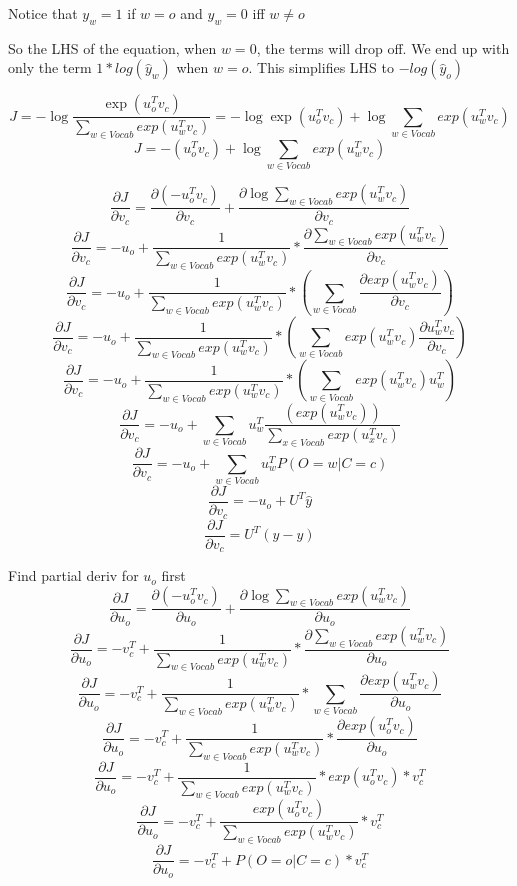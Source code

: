 \documentclass[11pt,largemargins]{homework}
\begin{document}
\maketitle
 
\question
  Notice that $y_w = 1$ if $w = o$ and $y_w = 0$ iff $w \ne o$

  So the LHS of the equation, when $w=0$, the terms will drop off. We end up with only the term $1 * log (\hat{y}_w)$ when $w = o$. This simplifies LHS to $-log (\hat{y}_o)$ 

\question
$$ J = -\log{\frac{\exp(u_o^T v_c)}{\sum_{w \in Vocab}{exp(u^T_w v_c)}}} = -\log{\exp(u_o^T v_c)} + \log{\sum_{w \in Vocab}{exp(u^T_w  v_c)}} $$
$$ J = -(u_o^T v_c) + \log{\sum_{w \in Vocab}{exp(u^T_w  v_c)}} $$

$$ \frac{\partial{J}}{\partial{v_c}} = \frac{\partial{(- u_o^T v_c)}}{\partial{v_c}} + \frac{\partial{\log{\sum_{w \in Vocab}{exp(u^T_w  v_c)}}}}{\partial{v_c}} $$
$$ \frac{\partial{J}}{\partial{v_c}} = -u_o + \frac{1}{\sum_{w \in Vocab}{exp(u^T_w  v_c)}} * \frac{\partial{\sum_{w \in Vocab}{exp(u^T_w  v_c)}}}{\partial{v_c}} $$
$$ \frac{\partial{J}}{\partial{v_c}} = -u_o + \frac{1}{\sum_{w \in Vocab}{exp(u^T_w  v_c)}} * (\sum_{w \in Vocab} \frac{\partial{{exp(u^T_w  v_c)}}}{\partial{v_c}}) $$
$$ \frac{\partial{J}}{\partial{v_c}} = -u_o + \frac{1}{\sum_{w \in Vocab}{exp(u^T_w  v_c)}} * (\sum_{w \in Vocab} exp(u^T_w  v_c) \frac{\partial{u^T_w  v_c}}{\partial{v_c}}) $$
$$ \frac{\partial{J}}{\partial{v_c}} = -u_o + \frac{1}{\sum_{w \in Vocab}{exp(u^T_w  v_c)}} * (\sum_{w \in Vocab} exp(u^T_w  v_c) u^T_w ) $$
$$ \frac{\partial{J}}{\partial{v_c}} = -u_o + \sum_{w \in Vocab} u^T_w \frac{( exp(u^T_w  v_c))}{\sum_{x \in Vocab}{exp(u^T_x  v_c)}} $$
$$ \frac{\partial{J}}{\partial{v_c}} = -u_o + \sum_{w \in Vocab} u^T_w P(O=w | C = c) $$
$$ \frac{\partial{J}}{\partial{v_c}} = -u_o + U^T \hat{y}  $$
$$ \frac{\partial{J}}{\partial{v_c}} =  U^T (\hat{y} - y)  $$


\question
Find partial deriv for $u_o$ first
$$ \frac{\partial{J}}{\partial{u_o}} = \frac{\partial{(- u_o^T v_c)}}{\partial{u_o}} + \frac{\partial{\log{\sum_{w \in Vocab}{exp(u^T_w  v_c)}}}}{\partial{u_o}} $$
$$ \frac{\partial{J}}{\partial{u_o}} = -v_c^T +  \frac{1}{\sum_{w \in Vocab}{exp(u^T_w  v_c)}} * \frac{\partial{\sum_{w \in Vocab}{exp(u^T_w  v_c)}}}{\partial{u_o}} $$
$$ \frac{\partial{J}}{\partial{u_o}} = -v_c^T +  \frac{1}{\sum_{w \in Vocab}{exp(u^T_w  v_c)}} * \sum_{w \in Vocab}\frac{\partial{{exp(u^T_w  v_c)}}}{\partial{u_o}} $$
$$ \frac{\partial{J}}{\partial{u_o}} = -v_c^T +  \frac{1}{\sum_{w \in Vocab}{exp(u^T_w  v_c)}} * \frac{\partial{exp(u^T_o  v_c)}}{\partial{u_o}} $$
$$ \frac{\partial{J}}{\partial{u_o}} = -v_c^T +  \frac{1}{\sum_{w \in Vocab}{exp(u^T_w  v_c)}} *exp(u^T_o  v_c)* v_c^T $$
$$ \frac{\partial{J}}{\partial{u_o}} = -v_c^T +  \frac{exp(u^T_o  v_c)}{\sum_{w \in Vocab}{exp(u^T_w  v_c)}} * v_c^T $$
$$ \frac{\partial{J}}{\partial{u_o}} = -v_c^T + P(O=o|C=c) * v_c^T $$
\end{document}
